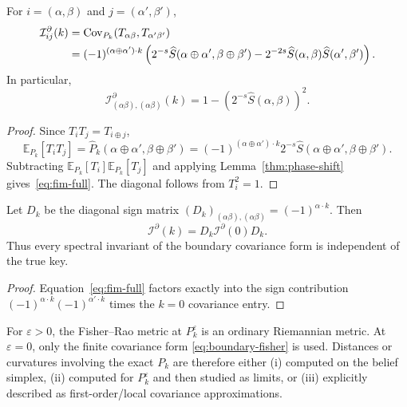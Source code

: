 \begin{proposition}\label{thm:fim}
For $i=(\alpha,\beta)$ and $j=(\alpha',\beta')$,
\begin{align}
  \mathcal I^{\partial}_{ij}(k)
  &=\operatorname{Cov}_{P_k}(T_{\alpha\beta},T_{\alpha'\beta'})\notag\\
  &=(-1)^{(\alpha\oplus\alpha')\cdot k}
  \left(
  2^{-s}\widehat S(\alpha\oplus\alpha',\beta\oplus\beta')
  -2^{-2s}\widehat S(\alpha,\beta)\widehat S(\alpha',\beta')
  \right).\label{eq:fim-full}
\end{align}
In particular,
\begin{equation}\label{eq:fim-diag}
  \mathcal I^{\partial}_{(\alpha\beta),(\alpha\beta)}(k)
  =1-\left(2^{-s}\widehat S(\alpha,\beta)\right)^2.
\end{equation}
\end{proposition}

\begin{proof}
Since $T_iT_j=T_{i\oplus j}$,
\[
 \mathbb E_{P_k}[T_iT_j]
 =\widehat P_k(\alpha\oplus\alpha',\beta\oplus\beta')
 =(-1)^{(\alpha\oplus\alpha')\cdot k}2^{-s}
 \widehat S(\alpha\oplus\alpha',\beta\oplus\beta').
\]
Subtracting
$\mathbb E_{P_k}[T_i]\mathbb E_{P_k}[T_j]$ and applying
Lemma~\ref{thm:phase-shift} gives~\eqref{eq:fim-full}.  The diagonal follows
from $T_i^2=1$.
\end{proof}

\begin{lemma}\label{lem:key-isometry}
Let $D_k$ be the diagonal sign matrix
$(D_k)_{(\alpha\beta),(\alpha\beta)}=(-1)^{\alpha\cdot k}$.  Then
\begin{equation}\label{eq:fim-factor}
  \mathcal I^{\partial}(k)=D_k\mathcal I^{\partial}(0)D_k.
\end{equation}
Thus every spectral invariant of the boundary covariance form is independent of
the true key.
\end{lemma}

\begin{proof}
Equation~\eqref{eq:fim-full} factors exactly into the sign contribution
$(-1)^{\alpha\cdot k}(-1)^{\alpha'\cdot k}$ times the $k=0$ covariance entry.
\end{proof}

\begin{remark}
For $\varepsilon>0$, the Fisher--Rao metric at $P_k^\varepsilon$ is an ordinary
Riemannian metric.  At $\varepsilon=0$, only the finite covariance form
\eqref{eq:boundary-fisher} is used.  Distances or curvatures involving the
exact $P_k$ are therefore either (i) computed on the belief simplex,
(ii) computed for $P_k^\varepsilon$ and then studied as limits, or
(iii) explicitly described as first-order/local covariance approximations.
\end{remark}


